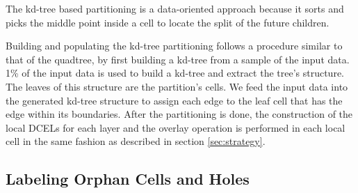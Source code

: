 The kd-tree based partitioning is a data-oriented approach because it sorts and picks the middle point inside a cell to locate the split of the future children. %

Building and populating the kd-tree partitioning follows a procedure similar to that of the quadtree, by first building a kd-tree from a sample of the input data.
1\% of the input data is used to build a kd-tree and extract the tree's structure. 
The leaves of this structure are the partition's cells. 
We feed the input data into the generated kd-tree structure to assign each edge to the leaf cell that has the edge within its boundaries.  
After the partitioning is done, the construction of the local DCELs for each layer and the overlay operation is performed in each local cell in the same fashion as described in section \ref{sec:strategy}. 



\subsection{Labeling Orphan Cells and Holes} \label{sec:anomalies}


